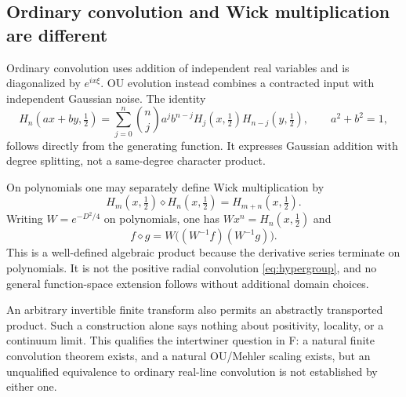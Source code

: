 \documentclass[11pt,reqno]{amsart}
\theoremstyle{remark}\newtheorem{remark}[proposition]{Remark}
\begin{document}
\subsection{Ordinary convolution and Wick multiplication are different}
Ordinary convolution uses addition of independent real variables and
is diagonalized by $e^{ix\xi}$. OU evolution instead combines a
contracted input with independent Gaussian noise. The identity
\[
 H_n(ax+by,\tfrac12)
 =\sum_{j=0}^n\binom nj a^jb^{n-j}
 H_j(x,\tfrac12)H_{n-j}(y,\tfrac12),\qquad a^2+b^2=1,
\]
follows directly from the generating function. It expresses Gaussian
addition with degree splitting, not a same-degree character product.

On polynomials one may separately define Wick multiplication by
\[
 H_m(x,\tfrac12)\diamond H_n(x,\tfrac12)=H_{m+n}(x,\tfrac12).
\]
Writing $W=e^{-D^2/4}$ on polynomials, one has $Wx^n=H_n(x,\tfrac12)$
and
\[
 f\diamond g=W\big((W^{-1}f)(W^{-1}g)\big).
\]
This is a well-defined algebraic product because the derivative series
terminate on polynomials. It is not the positive radial convolution
\eqref{eq:hypergroup}, and no general function-space extension follows
without additional domain choices.

An arbitrary invertible finite transform also permits an abstractly
transported product. Such a construction alone says nothing about
positivity, locality, or a continuum limit. This qualifies the
intertwiner question in F: a natural finite convolution theorem exists,
and a natural OU/Mehler scaling exists, but an unqualified equivalence
to ordinary real-line convolution is not established by either one.
\end{document}
